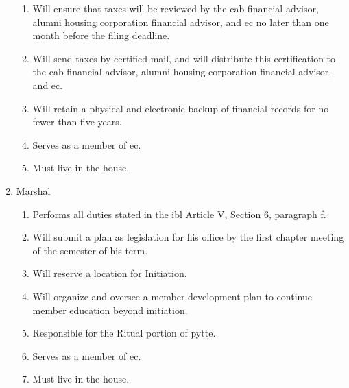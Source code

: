 \begin{enumerate}
\begin{enumerate}
				\item Will ensure that taxes will be reviewed by the \gls{cab} financial advisor, alumni housing corporation financial advisor, and \gls{ec} no later than one month before the filing deadline.
				\item Will send taxes by certified mail, and will distribute this certification to the \gls{cab} financial advisor, alumni housing corporation financial advisor, and \gls{ec}.
				\item Will retain a physical and electronic backup of financial records for no fewer than five years.
				\item Serves as a member of \gls{ec}.
				\item Must live in the house.
			\end{enumerate}
		
		\item Marshal
			\begin{enumerate}
				\item Performs all duties stated in the \gls{ibl} Article V, Section 6, paragraph f.
				\item Will submit a plan as legislation for his office by the first chapter meeting of the semester of his term.
				\item Will reserve a location for Initiation.
                \item Will organize and oversee a member development plan to continue member education beyond initiation.
				\item Responsible for the Ritual portion of \gls{pytte}.
				\item Serves as a member of \gls{ec}.
				\item Must live in the house.
			\end{enumerate}


\end{enumerate}
